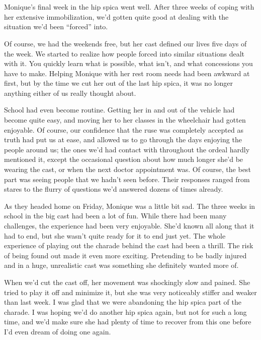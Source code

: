 \chapter{~}
Monique's final week in the hip spica went well. After three weeks of coping with her
extensive immobilization, we'd gotten quite good at dealing with the situation we'd been
``forced'' into.

Of course, we had the weekends free, but her cast defined our lives five days of the week.
We started to realize how people forced into similar situations dealt with it. You quickly learn
what is possible, what isn't, and what concessions you have to make. Helping Monique with her
rest room needs had been awkward at first, but by the time we cut her out of the last hip spica,
it was no longer anything either of us really thought about.

School had even become routine. Getting her in and out of the vehicle had become quite
easy, and moving her to her classes in the wheelchair had gotten enjoyable. Of course, our
confidence that the ruse was completely accepted as truth had put us at ease, and allowed us to
go through the days enjoying the people around us; the ones we'd had contact with throughout the
ordeal hardly mentioned it, except the occasional question about how much longer she'd be
wearing the cast, or when the next doctor appointment was. Of course, the best part was seeing
people that we hadn't seen before. Their responses ranged from stares to the flurry of questions
we'd answered dozens of times already.

\begin{thought}
As they headed home on Friday, Monique was a little bit sad. The three weeks in school in
the big cast had been a lot of fun. While there had been many challenges, the experience had
been very enjoyable. She'd known all along that it had to end, but she wasn't quite ready for it
to end just yet. The whole experience of playing out the charade behind the cast had been a
thrill. The risk of being found out made it even more exciting. Pretending to be badly injured
and in a huge, unrealistic cast was something she definitely wanted more of.
\end{thought}

When we'd cut the cast off, her movement was shockingly slow and pained. She tried to play
it off and minimize it, but she was very noticeably stiffer and weaker than last week. I was
glad that we were abandoning the hip spica part of the charade. I was hoping we'd do another hip
spica again, but not for such a long time, and we'd make sure she had plenty of time to recover
from this one before I'd even dream of doing one again.

